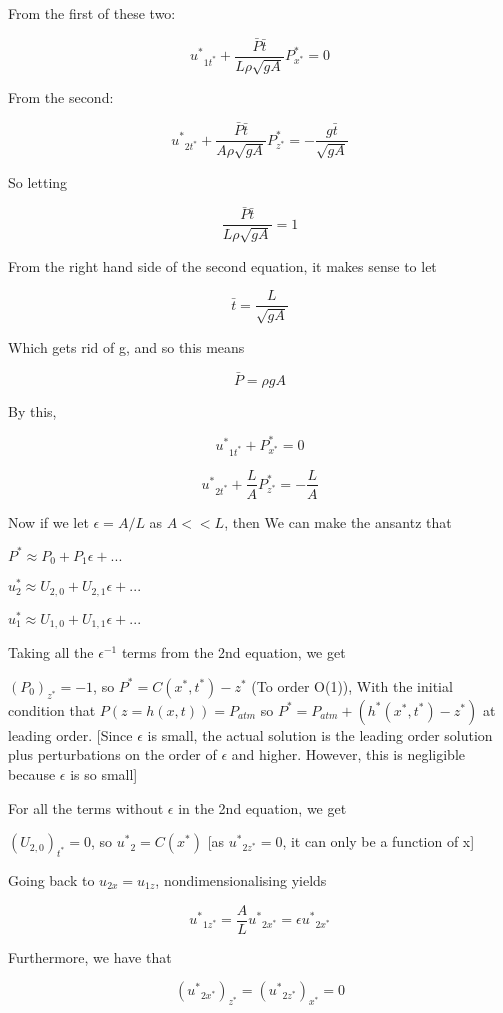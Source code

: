 \documentclass{article}
\begin{document}
From the first of these two: 

$$ {u^*}_{1t^*} +  \frac{\bar{P}\bar{t}}{L \rho \sqrt{gA}}P^*_{x^*}  = 0   $$

From the second: 

$$ {u^*}_{2t^*} +  \frac{\bar{P}\bar{t}}{A \rho \sqrt{gA}}P^*_{z^*}  = - \frac{g \bar{t}}{ \sqrt{gA}}   $$

So letting

$$\frac{\bar{P}\bar{t}}{L \rho \sqrt{gA}} = 1$$

From the right hand side of the second equation, it makes sense to let  

$$\bar{t} = \frac{L}{\sqrt{gA}}$$

Which gets rid of g, and so this means 

$$\bar{P} = {\rho g A}$$

By this, 

$$ {u^*}_{1t^*} +  P^*_{x^*}  = 0   $$

$$ {u^*}_{2t^*} +  \frac{L}{A}P^*_{z^*}  = - \frac{L}{A}   $$

Now if we let $\epsilon = A/L$ as $A << L$, then We can make the ansantz that 

$P^* \approx P_0 + P_1 \epsilon + ... $ 

$u_{2}^* \approx U_{2,0} + U_{2,1} \epsilon + ... $ 

$u_{1}^* \approx U_{1,0} + U_{1,1} \epsilon + ... $ 

Taking all the $\epsilon^{-1}$ terms from the 2nd equation, we get

$(P_0)_{z^*} = -1$, so $P^* = C(x^*, t^*)-z^* $ (To order O(1)), With the initial condition that $P(z = h(x, t)) = P_{atm}$ so $P^* = P_{atm}+(h^*(x^*,t^*)-z^*) $ at leading order. [Since $\epsilon$ is small, the actual solution is the leading order solution plus perturbations on the order of $\epsilon$ and higher. However, this is negligible because $\epsilon$ is so small]

For all the terms without $\epsilon$ in the 2nd equation, we get

$(U_{2,0})_{t^*} = 0$, so ${u^*}_{2} = C(x^*)$ [as ${u^*}_{2z^*} = 0$, it can only be a function of x]

Going back to $u_{2x} = u_{1z}$, nondimensionalising yields

$${u^*}_{1z^*} = \frac{A}{L} {u^*}_{2x^*} =  \epsilon {u^*}_{2x^*}$$

Furthermore, we have that 

$$({u^*}_{2x^*})_{z^*} = ({u^*}_{2z^*})_{x^*} = 0$$
\end{document}
